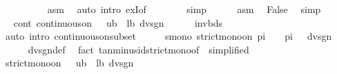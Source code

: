 \begin{isabellebody}
\ \ \ \ \ \ \ \ \isamarkupfalse%
\ asm\ \isamarkupfalse%
\ {\isacharparenleft}{\kern0pt}auto\ intro{\isacharcolon}{\kern0pt}\ exI{\isacharbrackleft}{\kern0pt}of\ {\isacharunderscore}{\kern0pt}\ {}{\isacharbrackright}{\kern0pt}{\isacharparenright}{\kern0pt}\isanewline
\ \ \ \ \isamarkupfalse%
\ simp\isanewline
\ \ \ \ \isamarkupfalse%
\ asm{\isacharparenleft}{\kern0pt}{}{\isacharparenright}{\kern0pt}\ \isamarkupfalse%
\ False\ \isamarkupfalse%
\ simp\isanewline
\ \ \isamarkupfalse%
\isanewline
\ \ \isamarkupfalse%
\ \isamarkupfalse%
\ cont{\isacharcolon}{\kern0pt}\ {\isachardoublequoteopen}continuous{\isacharunderscore}{\kern0pt}on\ {\isacharbraceleft}{\kern0pt}{}\ {\isacharslash}{\kern0pt}\ ub{\isachardot}{\kern0pt}{\isachardot}{\kern0pt}{}\ {\isacharslash}{\kern0pt}\ lb{\isacharbraceright}{\kern0pt}\ dvsgn{\isachardoublequoteclose}\isanewline
\ \ \ \ \isamarkupfalse%
\ invbds\ \isamarkupfalse%
\ {\isacharparenleft}{\kern0pt}auto\ intro{\isacharcolon}{\kern0pt}\ continuous{\isacharunderscore}{\kern0pt}on{\isacharunderscore}{\kern0pt}subset{\isacharparenright}{\kern0pt}\isanewline
\isanewline
\ \ \isamarkupfalse%
\ \isamarkupfalse%
\ smono{\isacharcolon}{\kern0pt}\ {\isachardoublequoteopen}strict{\isacharunderscore}{\kern0pt}mono{\isacharunderscore}{\kern0pt}on\ {\isacharbraceleft}{\kern0pt}pi\ {\isacharslash}{\kern0pt}\ {}{\isacharless}{\kern0pt}{\isachardot}{\kern0pt}{\isachardot}{\kern0pt}{\isacharless}{\kern0pt}{}\ {\isacharasterisk}{\kern0pt}\ pi\ {\isacharslash}{\kern0pt}\ {}{\isacharbraceright}{\kern0pt}\ dvsgn{\isachardoublequoteclose}\isanewline
\ \ \ \ \isamarkupfalse%
\ dvsgn{\isacharunderscore}{\kern0pt}def\ \isamarkupfalse%
\ {\isacharparenleft}{\kern0pt}fact\ tan{\isacharunderscore}{\kern0pt}minus{\isacharunderscore}{\kern0pt}id{\isacharunderscore}{\kern0pt}strict{\isacharunderscore}{\kern0pt}mono{\isacharbrackleft}{\kern0pt}of\ {}{\isacharcomma}{\kern0pt}\ simplified{\isacharbrackright}{\kern0pt}{\isacharparenright}{\kern0pt}\isanewline
\ \ \isamarkupfalse%
\ \isamarkupfalse%
\ {\isachardoublequoteopen}strict{\isacharunderscore}{\kern0pt}mono{\isacharunderscore}{\kern0pt}on\ {\isacharbraceleft}{\kern0pt}{}\ {\isacharslash}{\kern0pt}\ ub{\isachardot}{\kern0pt}{\isachardot}{\kern0pt}{}\ {\isacharslash}{\kern0pt}\ lb{\isacharbraceright}{\kern0pt}\ dvsgn{\isachardoublequoteclose}\isanewline

\end{isabellebody}
